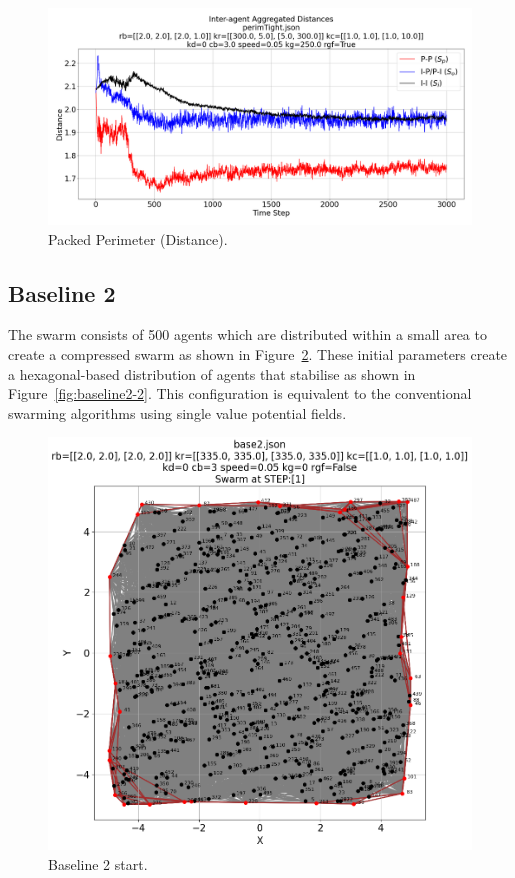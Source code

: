 \documentclass[12pt,a4paper]{IEEEtran}
\begin{document}
\begin{figure}[H]
	\begin{center}
		\includegraphics[width=1.0\linewidth]{figures/tightPerimDistance}
	\end{center}
	\caption{Packed Perimeter (Distance). \label{fig:tightPerimDistance}}
\end{figure}


\subsection{Baseline 2}
The swarm consists of 500 agents which are distributed within a small area to create a compressed swarm as shown in Figure~\ref{fig:baseline2}. These initial parameters create a hexagonal-based distribution of agents that stabilise as shown in Figure~\ref{fig:baseline2-2}. This configuration is equivalent to the conventional swarming algorithms using single value potential fields. 

\begin{figure}[H]
	\begin{center}
		\includegraphics[width=1.0\linewidth]{figures/baseline2-1}
	\end{center}
	\caption{Baseline 2 start. \label{fig:baseline2}}
\end{figure}
\end{document}
